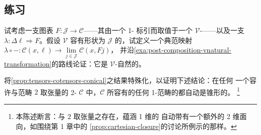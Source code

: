\subsection*{练习}

\begin{exercise}\label{ex:conical-map-vnatural}
试考虑一支图表 $F\colon\mathcal{J}\to\mathcal{C}$——其由一个 1-\trCategory{}%
标引而取值于一个 $\mathcal{V}$-\trCategory——以及一支\trCone{}
$\lambda\colon\Delta\ell\Rightarrow F$。假设 $\mathcal{V}$ 容有形状为
$\mathcal{J}$ 的\trLimit，试定义一个典范映射
$\lambda\circ-\colon\mathcal{C}(x,\ell)\to\lim\limits_{j\in\mathcal{J}}\mathcal{C}(x,Fj)$，
并沿\cref{exa:post-composition-vnatural-transformation}的路线论证：它是
$\mathcal{V}$-自然的。
\end{exercise}

\begin{exercise}\label{ex:2cat-tensors-conical}
将\cref{prop:tensors-cotensors-conical}之结果特殊化，以证明下述结论：在任何
一个容许与\trWalkingArrow{}范畴 $2$ 取张量的 2-\trCategory{} $\mathcal{C}$
中，$\mathcal{C}$ 所容有的任何 1-范畴的\trLimit{}都自动是锥形的。%
\footnote{本陈述断言：与 $2$ 取张量之存在，蕴涵 1 维\trLimit{}的%
\trUniversalProperty{}自动带有一个额外的 2 维面向，如围绕第 1 章中的%
\cref{prop:cartesian-closure}的讨论所例示的那样。}
\end{exercise}

